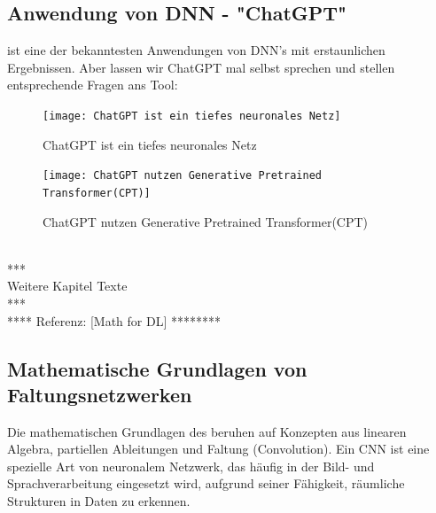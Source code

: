 \documentclass[12pt]{article}
\begin{document}
\subsection{Anwendung von DNN - "ChatGPT"}
%
{\color{blue}{ChatGPT)}} ist eine der bekanntesten Anwendungen von DNN's mit erstaunlichen Ergebnissen.
Aber lassen wir ChatGPT mal selbst sprechen und stellen entsprechende Fragen ans Tool:\\
\begin{figure}[tp]
  \centering
  \hspace*{-0.1cm} 
  \texttt{[image: ChatGPT ist ein tiefes neuronales Netz]}
  \caption{ChatGPT ist ein tiefes neuronales Netz} 
  \label{fig:ChatGPT=DNN}
\end{figure}
\begin{figure}[tp]
  \centering
  \hspace*{-0.1cm} 
  \texttt{[image: ChatGPT nutzen Generative Pretrained Transformer(CPT)]}
  \caption{ChatGPT nutzen Generative Pretrained Transformer(CPT)}     
  \label{fig:ChatGPt-Transformer}
\end{figure}
\\[10.2cm] 
***\\ Weitere Kapitel Texte \\
***\\
**** Referenz: [Math for DL] ******** 
\subsection{Mathematische Grundlagen von Faltungsnetzwerken}
%
Die mathematischen Grundlagen des {\color{blue}{Faltungsnetzwerke: Englisch auch oft Convolutional Neural Networks (CNN)genannt }} beruhen auf Konzepten aus linearen Algebra, partiellen Ableitungen und Faltung (Convolution). Ein CNN ist eine spezielle Art von neuronalem Netzwerk, das häufig in der Bild- und Sprachverarbeitung eingesetzt wird, aufgrund seiner Fähigkeit, räumliche Strukturen in Daten zu erkennen.\\
\end{document}
